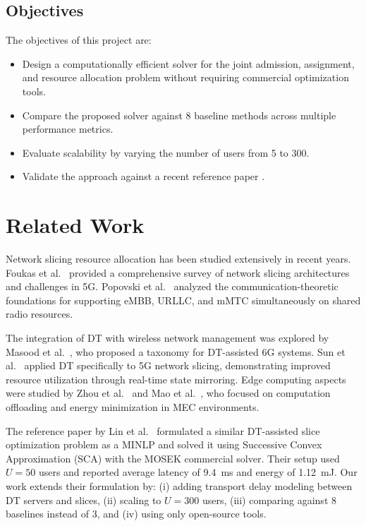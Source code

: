 \documentclass[12pt]{article}
\begin{document}
\subsection{Objectives}
The objectives of this project are:
\begin{itemize}
    \item Design a computationally efficient solver for the joint admission, assignment, and resource allocation problem without requiring commercial optimization tools.
    \item Compare the proposed solver against 8 baseline methods across multiple performance metrics.
    \item Evaluate scalability by varying the number of users from 5 to 300.
    \item Validate the approach against a recent reference paper \cite{lin2023energy}.
\end{itemize}

\newpage

\section{Related Work}

Network slicing resource allocation has been studied extensively in recent years. Foukas et al.\ \cite{foukas2017network} provided a comprehensive survey of network slicing architectures and challenges in 5G. Popovski et al.\ \cite{popovski2018wireless} analyzed the communication-theoretic foundations for supporting eMBB, URLLC, and mMTC simultaneously on shared radio resources.

The integration of DT with wireless network management was explored by Masood et al.\ \cite{masood2022digital}, who proposed a taxonomy for DT-assisted 6G systems. Sun et al.\ \cite{sun2022digital} applied DT specifically to 5G network slicing, demonstrating improved resource utilization through real-time state mirroring. Edge computing aspects were studied by Zhou et al.\ \cite{zhou2019edge} and Mao et al.\ \cite{mao2017energy}, who focused on computation offloading and energy minimization in MEC environments.

The reference paper by Lin et al.\ \cite{lin2023energy} formulated a similar DT-assisted slice optimization problem as a MINLP and solved it using Successive Convex Approximation (SCA) with the MOSEK commercial solver. Their setup used $U = 50$ users and reported average latency of 9.4~ms and energy of 1.12~mJ. Our work extends their formulation by: (i) adding transport delay modeling between DT servers and slices, (ii) scaling to $U = 300$ users, (iii) comparing against 8 baselines instead of 3, and (iv) using only open-source tools.
\end{document}
